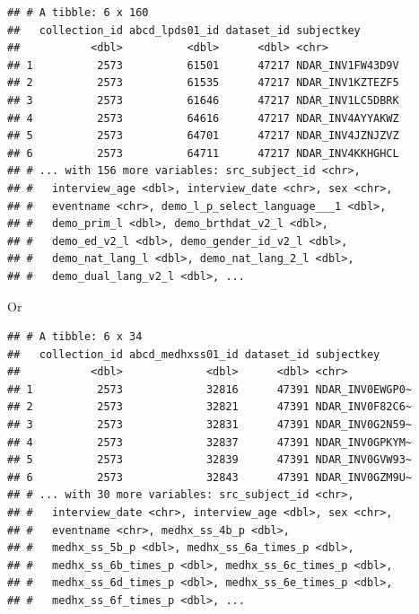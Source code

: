 \documentclass[
]{book}
\newenvironment{Shaded}{\begin{snugshade}}{\end{snugshade}}
\newcommand{\FunctionTok}[1]{\textcolor[rgb]{0.00,0.00,0.00}{#1}}
\newcommand{\NormalTok}[1]{#1}
\newcommand{\SpecialCharTok}[1]{\textcolor[rgb]{0.00,0.00,0.00}{#1}}
\begin{document}
\begin{Shaded}
\end{Shaded}

\begin{verbatim}
## # A tibble: 6 x 160
##   collection_id abcd_lpds01_id dataset_id subjectkey      
##           <dbl>          <dbl>      <dbl> <chr>           
## 1          2573          61501      47217 NDAR_INV1FW43D9V
## 2          2573          61535      47217 NDAR_INV1KZTEZF5
## 3          2573          61646      47217 NDAR_INV1LC5DBRK
## 4          2573          64616      47217 NDAR_INV4AYYAKWZ
## 5          2573          64701      47217 NDAR_INV4JZNJZVZ
## 6          2573          64711      47217 NDAR_INV4KKHGHCL
## # ... with 156 more variables: src_subject_id <chr>,
## #   interview_age <dbl>, interview_date <chr>, sex <chr>,
## #   eventname <chr>, demo_l_p_select_language___1 <dbl>,
## #   demo_prim_l <dbl>, demo_brthdat_v2_l <dbl>,
## #   demo_ed_v2_l <dbl>, demo_gender_id_v2_l <dbl>,
## #   demo_nat_lang_l <dbl>, demo_nat_lang_2_l <dbl>,
## #   demo_dual_lang_v2_l <dbl>, ...
\end{verbatim}

Or

\begin{Shaded}
\end{Shaded}

\begin{verbatim}
## # A tibble: 6 x 34
##   collection_id abcd_medhxss01_id dataset_id subjectkey     
##           <dbl>             <dbl>      <dbl> <chr>          
## 1          2573             32816      47391 NDAR_INV0EWGP0~
## 2          2573             32821      47391 NDAR_INV0F82C6~
## 3          2573             32831      47391 NDAR_INV0G2N59~
## 4          2573             32837      47391 NDAR_INV0GPKYM~
## 5          2573             32839      47391 NDAR_INV0GVW93~
## 6          2573             32843      47391 NDAR_INV0GZM9U~
## # ... with 30 more variables: src_subject_id <chr>,
## #   interview_date <chr>, interview_age <dbl>, sex <chr>,
## #   eventname <chr>, medhx_ss_4b_p <dbl>,
## #   medhx_ss_5b_p <dbl>, medhx_ss_6a_times_p <dbl>,
## #   medhx_ss_6b_times_p <dbl>, medhx_ss_6c_times_p <dbl>,
## #   medhx_ss_6d_times_p <dbl>, medhx_ss_6e_times_p <dbl>,
## #   medhx_ss_6f_times_p <dbl>, ...
\end{verbatim}
\end{document}
